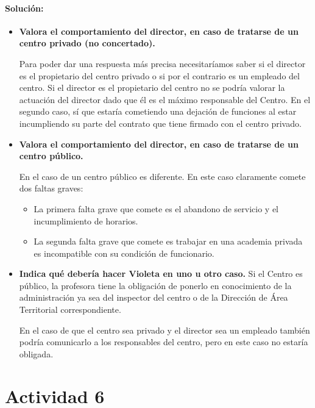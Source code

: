 \paragraph{Solución: }

\begin{itemize}
\item \textbf{Valora el comportamiento del director, en caso de tratarse de un centro privado (no concertado).
}

Para poder dar una respuesta más precisa necesitaríamos saber si el director es el propietario del centro privado o si por el contrario es un empleado del centro.
 Si el director es el propietario del centro no se podría valorar la actuación del director dado que él es el máximo responsable del Centro.
 En el segundo caso, sí que estaría cometiendo una dejación de funciones al estar incumpliendo su parte del contrato que tiene firmado con el centro privado.



\item \textbf{Valora el comportamiento del director, en caso de tratarse de un centro público.
}

En el caso de un centro público es diferente.
 En este caso claramente comete dos faltas graves:

\begin{itemize}
\item La primera falta grave que comete es el abandono de servicio y el incumplimiento de horarios.

\item La segunda falta grave que comete es trabajar en una academia privada es incompatible con su condición de funcionario.

\end{itemize}


\item \textbf{Indica qué debería hacer Violeta en uno u otro caso.
}
Si el Centro es público, la profesora tiene la obligación de ponerlo en conocimiento de la administración ya sea del inspector del centro o de la Dirección de Área Territorial correspondiente.

%
En el caso de que el centro sea privado y el director sea un empleado también podría comunicarlo a los responsables del centro, pero en este caso no estaría obligada.


\end{itemize}


\newpage
\section*{Actividad 6}
